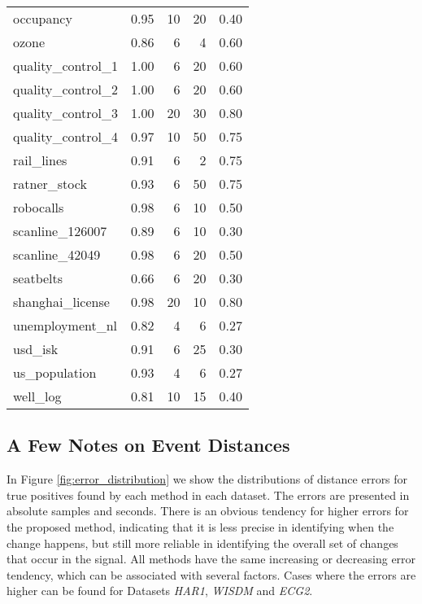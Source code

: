 \begin{table}[h]
\begin{tabular}{lrrrr}
    occupancy &  0.95 &   10 &   20 &  0.40 \\
    ozone &  0.86 &    6 &    4 &  0.60 \\
    quality\_control\_1 &  1.00 &    6 &   20 &  0.60 \\
    quality\_control\_2 &  1.00 &    6 &   20 &  0.60 \\
    quality\_control\_3 &  1.00 &   20 &   30 &  0.80 \\
    quality\_control\_4 &  0.97 &   10 &   50 &  0.75 \\
    rail\_lines &  0.91 &    6 &    2 &  0.75 \\
    ratner\_stock &  0.93 &    6 &   50 &  0.75 \\
    robocalls &  0.98 &    6 &   10 &  0.50 \\
    scanline\_126007 &  0.89 &    6 &   10 &  0.30 \\
    scanline\_42049 &  0.98 &    6 &   20 &  0.50 \\
    seatbelts &  0.66 &    6 &   20 &  0.30 \\
    shanghai\_license &  0.98 &   20 &   10 &  0.80 \\
    unemployment\_nl &  0.82 &    4 &    6 &  0.27 \\
    usd\_isk &  0.91 &    6 &   25 &  0.30 \\
    us\_population &  0.93 &    4 &    6 &  0.27 \\
    well\_log &  0.81 &   10 &   15 &  0.40 \\
    \bottomrule
    \end{tabular}
\end{table}

\subsection{A Few Notes on Event Distances}

In Figure \ref{fig:error_distribution} we show the distributions of distance errors for true positives  found by each method in each dataset. The errors are presented in absolute samples and seconds. There is an obvious tendency for higher errors for the proposed method, indicating that it is less precise in identifying when the change happens, but still more reliable in identifying the overall set of changes that occur in the signal. All methods have the same increasing or decreasing error tendency, which can be associated with several factors. Cases where the errors are higher can be found for Datasets \textit{HAR1}, \textit{WISDM} and \textit{ECG2}. 
 
